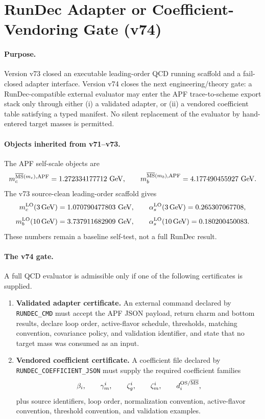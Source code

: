 \section{RunDec Adapter or Coefficient-Vendoring Gate (v74)}
\label{sec:v74-rundec-adapter-vendoring}

\paragraph{Purpose.}
Version v73 closed an executable leading-order QCD running scaffold and a fail-closed adapter interface.  Version v74 closes the next engineering/theory gate: a RunDec-compatible external evaluator may enter the APF trace-to-scheme export stack only through either (i) a validated adapter, or (ii) a vendored coefficient table satisfying a typed manifest.  No silent replacement of the evaluator by hand-entered target masses is permitted.

\paragraph{Objects inherited from v71--v73.}
The APF self-scale objects are
\[
 m_c^{\overline{\rm MS}(m_c),{\rm APF}}=1.272334177712\ {\rm GeV},
 \qquad
 m_b^{\overline{\rm MS}(m_b),{\rm APF}}=4.177490455927\ {\rm GeV}.
\]
The v73 source-clean leading-order scaffold gives
\[
 m_c^{\rm LO}(3\,{\rm GeV})=1.070790477803\ {\rm GeV},
 \qquad
 \alpha_s^{\rm LO}(3\,{\rm GeV})=0.265307067708,
\]
\[
 m_b^{\rm LO}(10\,{\rm GeV})=3.737911682909\ {\rm GeV},
 \qquad
 \alpha_s^{\rm LO}(10\,{\rm GeV})=0.180200450083.
\]
These numbers remain a baseline self-test, not a full RunDec result.

\paragraph{The v74 gate.}
A full QCD evaluator is admissible only if one of the following certificates is supplied.

\begin{enumerate}
\item \textbf{Validated adapter certificate.}  An external command declared by \texttt{RUNDEC\_CMD} must accept the APF JSON payload, return charm and bottom results, declare loop order, active-flavor schedule, thresholds, matching convention, covariance policy, and validation identifier, and state that no target mass was consumed as an input.
\item \textbf{Vendored coefficient certificate.}  A coefficient file declared by \texttt{RUNDEC\_COEFFICIENT\_JSON} must supply the required coefficient families
\[
 \beta_i,
 \qquad
 \gamma_m^i,
 \qquad
 \zeta_g^i,
 \qquad
 \zeta_m^i,
 \qquad
 d_i^{\rm OS/\overline{MS}},
\]
plus source identifiers, loop order, normalization convention, active-flavor convention, threshold convention, and validation examples.
\end{enumerate}

